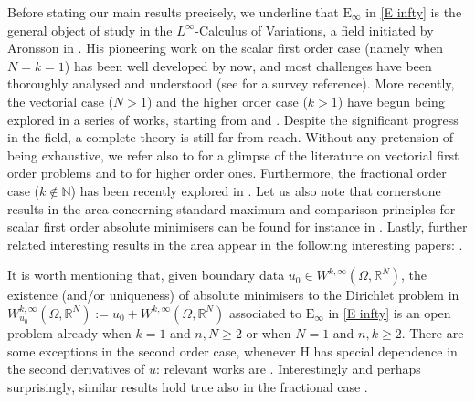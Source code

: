 \documentclass[a4paper,11pt]{article}
\numberwithin{equation}{section}
\newcommand{\numberset}{\mathbb}
\newcommand{\N}{\numberset{N}}
\newcommand{\Om}{\Omega}
\newcommand{\R}{\numberset{R}}
\newcommand{\rom}{\mathrm}
\theoremstyle{definition}
\begin{document}
Before stating our main results precisely, we underline that $\mathrm E_\infty$ in \eqref{E infty} is the general object of study in the $L^\infty$-Calculus of Variations, a field initiated by Aronsson in \cite{A}. His pioneering work on the scalar first order case (namely when $N=k=1$) has been well developed by now, and most challenges have been thoroughly analysed and understood (see \cite{Kbook} for a survey reference). More recently,  the vectorial case ($N>1$) and the higher order case ($k>1$) have begun being explored in a series of works, starting from \cite{K1} and \cite{KM,KP2}. Despite the significant progress in the field, a complete theory is still far from reach. Without any pretension of being exhaustive, we refer also to \cite{K3,K4,KM1} for a glimpse of the literature on vectorial first order problems and to \cite{CKM,DK,KP1,KM2,KM3} for higher order ones. Furthermore, the fractional order case ($k\notin\N$) has been recently explored in \cite{CM}. Let us also note that cornerstone results in the area concerning standard maximum and comparison principles for scalar first order absolute minimisers can be found for instance in \cite{J, ACJS}.  Lastly, further related interesting results in the area appear in the following interesting papers: \cite{AP, A-B, BJ, BDP, BK, CDP, KZ, MWZ, PWZ, PZ, RZ, Ribeiro-Zappale-2024}. 



It is worth mentioning that, given boundary data $u_0\in W^{k,\infty}(\Om,\R^N)$, the existence (and/or uniqueness) of absolute minimisers to the Dirichlet problem in $W_{u_0}^{k,\infty}(\Om,\R^N):=u_0+ W^{k,\infty}(\Om,\R^N)$ associated to $\mathrm E_\infty$ in \eqref{E infty} 
 is an open problem already when $k=1$ and $n,N\geq 2$ or when $N=1$ and $n,k\geq 2$. There are some exceptions in the second order case, whenever $\rom H$ has special dependence in the second derivatives of $u$: relevant works are \cite{KM, KM3, KP2, CKM}. Interestingly and perhaps surprisingly, similar results hold true also in the fractional case \cite{CM}.
\end{document}
